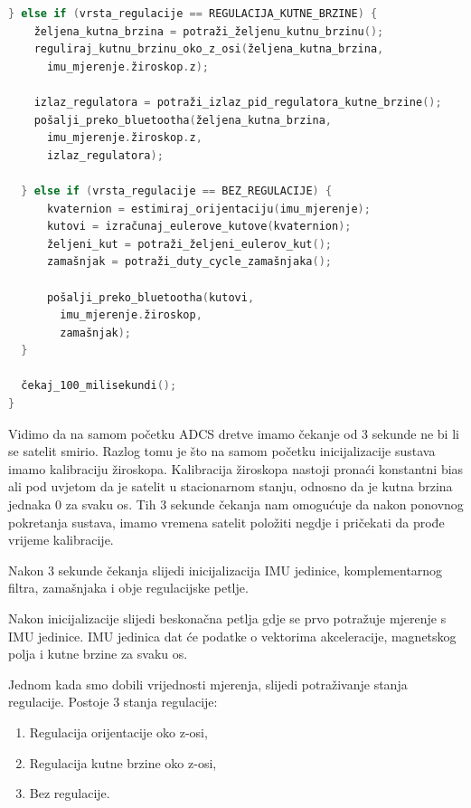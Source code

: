 \documentclass[times, utf8, diplomski, numeric]{templates/template}
\begin{document}
{{{{\begin{lstlisting}[language=C]
  } else if (vrsta_regulacije == REGULACIJA_KUTNE_BRZINE) {
    željena_kutna_brzina = potraži_željenu_kutnu_brzinu();
    reguliraj_kutnu_brzinu_oko_z_osi(željena_kutna_brzina, 
      imu_mjerenje.žiroskop.z);

    izlaz_regulatora = potraži_izlaz_pid_regulatora_kutne_brzine();
    pošalji_preko_bluetootha(željena_kutna_brzina, 
      imu_mjerenje.žiroskop.z, 
      izlaz_regulatora);

  } else if (vrsta_regulacije == BEZ_REGULACIJE) {
      kvaternion = estimiraj_orijentaciju(imu_mjerenje);
      kutovi = izračunaj_eulerove_kutove(kvaternion);
      željeni_kut = potraži_željeni_eulerov_kut();
      zamašnjak = potraži_duty_cycle_zamašnjaka();

      pošalji_preko_bluetootha(kutovi, 
        imu_mjerenje.žiroskop, 
        zamašnjak);
  }

  čekaj_100_milisekundi();
}               \end{lstlisting}

                Vidimo da na samom početku ADCS dretve imamo čekanje od 3 sekunde ne bi li se satelit smirio. Razlog tomu je što na samom početku inicijalizacije sustava imamo kalibraciju žiroskopa. Kalibracija žiroskopa nastoji pronaći konstantni bias ali pod uvjetom da je satelit u stacionarnom stanju, odnosno da je kutna brzina jednaka 0 za svaku os. Tih 3 sekunde čekanja nam omogućuje da nakon ponovnog pokretanja sustava, imamo vremena satelit položiti negdje i pričekati da prođe vrijeme kalibracije.

                Nakon 3 sekunde čekanja slijedi inicijalizacija IMU jedinice, komplementarnog filtra, zamašnjaka i obje regulacijske petlje.

                Nakon inicijalizacije slijedi beskonačna petlja gdje se prvo potražuje mjerenje s IMU jedinice. IMU jedinica dat će podatke o vektorima akceleracije, magnetskog polja i kutne brzine za svaku os. 

                Jednom kada smo dobili vrijednosti mjerenja, slijedi potraživanje stanja regulacije. Postoje 3 stanja regulacije: 

                \begin{enumerate}
                    \item Regulacija orijentacije oko z-osi,
                    \item Regulacija kutne brzine oko z-osi,
                    \item Bez regulacije.
                \end{enumerate}

}}}}
\end{document}
